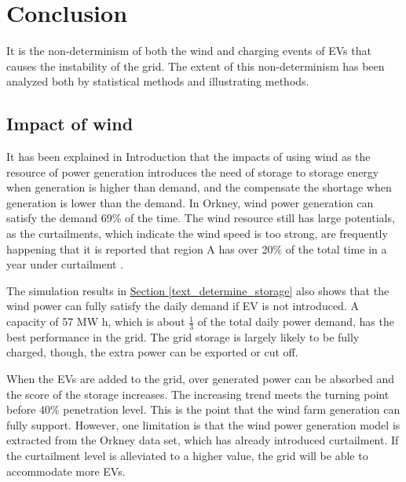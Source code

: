 \documentclass[12pt,a4paper]{report}
\begin{document}
    \chapter{Conclusion}
    It is the non-determinism of both the wind and charging events of EVs that causes the instability of the grid. The extent of this non-determinism has been analyzed both by statistical methods and illustrating methods. 
        \section{Impact of wind}
        It has been explained in Introduction that the impacts of using wind as the resource of power generation introduces the need of storage to storage energy when generation is higher than demand, and the compensate the shortage when generation is lower than the demand. In Orkney, wind power generation can satisfy the demand 69\% of the time. The wind resource still has large potentials, as the curtailments, which indicate the wind speed is too strong, are frequently happening that it is reported that region A has over 20\% of the total time in a year under curtailment \cite{report:OrkneyAudit}.

        The simulation results in \hyperref[text_determine_storage]{Section \ref*{text_determine_storage}} also shows that the wind power can fully satisfy the daily demand if EV is not introduced. A capacity of 57 MW h, which is about $\frac{1}{3}$ of the total daily power demand, has the best performance in the grid.
        The grid storage is largely likely to be fully charged, though, the extra power can be exported or cut off. 
        
        When the EVs are added to the grid, over generated power can be absorbed and the score of the storage increases. The increasing trend meets the turning point before 40\% penetration level. This is the point that the wind farm generation can fully support. However, one limitation is that the wind power generation model is extracted from the Orkney data set, which has already introduced curtailment. If the curtailment level is alleviated to a higher value, the grid will be able to accommodate more EVs.
\end{document}
